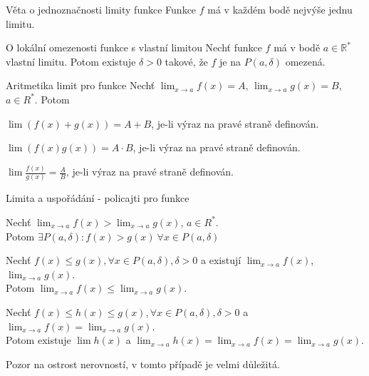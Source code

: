 \begin{vetaN}{Věta o jednoznačnosti limity funkce}
Funkce $f$ má v každém bodě nejvýše jednu limitu.
\end{vetaN}

\begin{vetaN}{O lokální omezenosti funkce s vlastní limitou}
Nechť funkce $f$ má v bodě $a \in \mathbb{R}^{*}$ vlastní limitu. Potom existuje $\delta > 0$ takové, že $f$ je na $P(a, \delta)$ omezená.
\end{vetaN}

\begin{vetaN}{Aritmetika limit pro funkce}
Nechť $\lim_{x \rightarrow a} f(x)=A$, $\lim_{x \rightarrow a} g(x)=B$, $a \in R^{*}$. Potom
\begin{penumerate}
	\item $\lim (f(x)+g(x)) = A+B$, je-li výraz na pravé straně definován.
	\item $\lim (f(x)g(x)) = A\cdot B$, je-li výraz na pravé straně definován.
	\item $\lim \frac{f(x)}{g(x)} = \frac{A}{B}$, je-li výraz na pravé straně definován.
\end{penumerate}
\end{vetaN}

\begin{vetaN}{Limita a uspořádání - policajti pro funkce}
\begin{penumerate}
	\item Nechť $\lim_{x \rightarrow a} f(x) > \lim_{x \rightarrow a} g(x)$, $a \in R^{*}$.\\Potom $\exists P(a, \delta): f(x)>g(x) \ \forall x \in P(a, \delta)$
	\item Nechť $f(x) \le g(x), \forall x \in P(a, \delta), \delta > 0$ a existují $\lim_{x \rightarrow a} f(x)$, $\lim_{x \rightarrow a} g(x)$.\\Potom $\lim_{x\to a} f(x) \le \lim_{x\to a} g(x)$.
	\item Nechť $f(x) \le h(x) \le g(x), \forall x \in P(a, \delta), \delta > 0$ a $\lim_{x \rightarrow a} f(x) = \lim_{x \rightarrow a} g(x)$.\\Potom existuje $\lim h(x)$ a $\lim_{x \rightarrow a} h(x) = \lim_{x \rightarrow a} f(x) = \lim_{x \rightarrow a} g(x)$.
\end{penumerate}
Pozor na ostrost nerovností, v tomto případě je velmi důležitá.
\end{vetaN}


